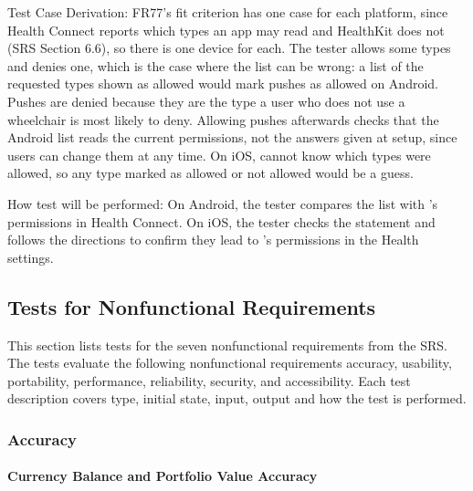 \documentclass[12pt, titlepage]{article}
\begin{document}
\begin{enumerate}
Test Case Derivation: FR77's fit criterion has one case for each platform,
since Health Connect reports which types an app may read and HealthKit does
not (SRS Section 6.6), so there is one device for each. The tester allows
some types and denies one, which is the case where the list can be wrong: a
list of the requested types shown as allowed would mark pushes as allowed on
Android. Pushes are denied because they are the type a user who does not use
a wheelchair is most likely to deny. Allowing pushes afterwards checks that
the Android list reads the current permissions, not the answers given at
setup, since users can change them at any time. On iOS, \progname{} cannot
know which types were allowed, so any type marked as allowed or not allowed
would be a guess.

How test will be performed: On Android, the tester compares the list with
\progname{}'s permissions in Health Connect. On iOS, the tester checks the
statement and follows the directions to confirm they lead to \progname{}'s
permissions in the Health settings.

\end{enumerate}

\subsection{Tests for Nonfunctional Requirements}

This section lists tests for the seven nonfunctional requirements from the SRS. The tests evaluate the following nonfunctional requirements accuracy, usability, portability, performance, reliability, security, and accessibility. Each test description covers type, initial state, input, output and how the test is performed. 


\subsubsection{Accuracy}
		
\paragraph{Currency Balance and Portfolio Value Accuracy}
\end{document}
